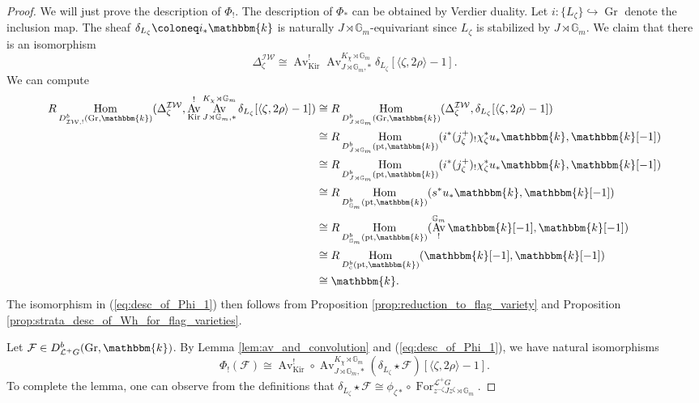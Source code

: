 \documentclass{amsart}
\renewcommand{\L}{\mathcal{L}}
\newcommand{\G}{\mathbb{G}}
\renewcommand{\k}{\mathbbm{k}}
\newcommand{\scrF}{\mathcal{F}}
\newcommand{\IW}{\mathcal{IW}}
\DeclareMathOperator{\Hom}{Hom}
\DeclareMathOperator{\cons}{c}
\DeclareMathOperator{\Av}{Av}
\DeclareMathOperator{\For}{For}
\DeclareMathOperator{\pt}{pt}
\DeclareMathOperator{\Gr}{Gr}
\DeclareMathOperator{\Kir}{Kir}
\theoremstyle{definition}
\begin{document}
    \begin{proof}
        We will just prove the description of $\Phi_!$. The description of $\Phi_*$ can be obtained by Verdier duality.
        Let $i : \{L_{\zeta}\} \hookrightarrow \Gr$ denote the inclusion map. 
        The sheaf $\delta_{L_{\zeta}} \coloneq i_* \k$ is naturally $J \rtimes \G_m$-equivariant since $L_{\zeta}$ is stabilized by $J \rtimes \G_m$. 
        We claim that there is an isomorphism
        \begin{equation}\label{eq:desc_of_Phi_1}
            \Delta_{\zeta}^{\IW} \cong \Av_{\Kir}^!  \Av_{J \rtimes \G_m, *}^{K_{\chi} \rtimes \G_m} \delta_{L_{\zeta}} [\langle \zeta, 2\rho \rangle - 1].
        \end{equation}
        We can compute
        \begin{align*}
            R\Hom_{D_{\IW, !}^b (\Gr, \k)} (\Delta_{\zeta}^{\IW}, \Av_{\Kir}^!  \Av_{J \rtimes \G_m, *}^{K_{\chi} \rtimes \G_m} \delta_{L_{\zeta}} [\langle \zeta, 2\rho \rangle - 1]) &\cong R\Hom_{D_{J \rtimes \G_m}^b (\Gr, \k)} (\Delta_{\zeta}^{\IW}, \delta_{L_{\zeta}} [\langle \zeta, 2\rho \rangle - 1]) \\
            &\cong R\Hom_{D_{J \rtimes \G_m}^b (\pt, \k)} (i^* (j_{\zeta}^+)_! \chi_{\zeta}^* u_* \k, \k [-1] ) \\
            &\cong R\Hom_{D_{J \rtimes \G_m}^b (\pt, \k)} (i^* (j_{\zeta}^+)_! \chi_{\zeta}^* u_* \k, \k [-1] ) \\ 
            &\cong R\Hom_{D_{\G_m}^b (\pt, \k)} (s^* u_* \k, \k [-1]) \\
            &\cong R\Hom_{D_{\G_m}^b (\pt, \k)} (\Av_!^{\G_m} \k [-1], \k [-1]) \\
            &\cong R\Hom_{D_{\cons}^b (\pt, \k)} (\k [-1], \k [-1]) \\
            &\cong \k.
        \end{align*}
        The isomorphism in (\ref{eq:desc_of_Phi_1}) then follows from Proposition \ref{prop:reduction_to_flag_variety} and Proposition \ref{prop:strata_desc_of_Wh_for_flag_varieties}.

        Let $\scrF \in D_{\L^+ G}^b (\Gr, \k)$. By Lemma \ref{lem:av_and_convolution} and (\ref{eq:desc_of_Phi_1}), we have natural isomorphisms
        \[\Phi_! (\scrF) \cong \Av_{\Kir}^! \circ \Av_{J \rtimes \G_m, *}^{K_{\chi} \rtimes \G_m} (\delta_{L_{\zeta}} \star \scrF) [\langle \zeta, 2\rho \rangle - 1].\]
        To complete the lemma, one can observe from the definitions that $\delta_{L_{\zeta}} \star \scrF \cong \phi_{\zeta *} \circ \For^{\L^+ G}_{z^{-\zeta} J z^{\zeta} \rtimes \G_m}$.
    \end{proof}
\end{document}
